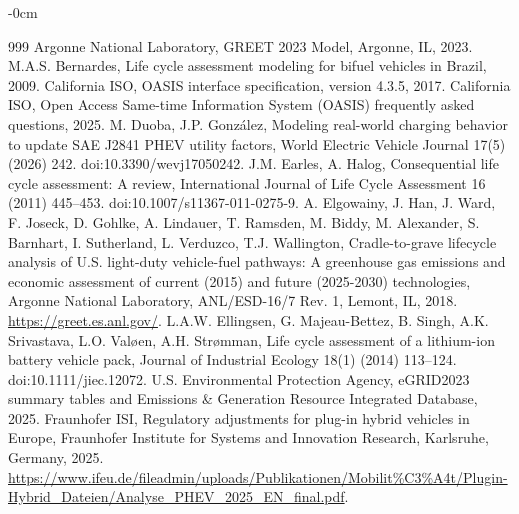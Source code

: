 \documentclass[cleantechnol,article,submit,pdftex,moreauthors]{Definitions/mdpi}
\begin{document}
%
\begin{adjustwidth}{-\extralength}{0cm}


\begin{thebibliography}{999}
Argonne National Laboratory, GREET 2023 Model, Argonne, IL, 2023.
M.A.S. Bernardes, Life cycle assessment modeling for bifuel vehicles in Brazil, 2009.
California ISO, OASIS interface specification, version 4.3.5, 2017.
California ISO, Open Access Same-time Information System (OASIS) frequently asked questions, 2025.
M. Duoba, J.P. González, Modeling real-world charging behavior to update SAE J2841 PHEV utility factors, World Electric Vehicle Journal 17(5) (2026) 242. doi:10.3390/wevj17050242.
J.M. Earles, A. Halog, Consequential life cycle assessment: A review, International Journal of Life Cycle Assessment 16 (2011) 445--453. doi:10.1007/s11367-011-0275-9.
A. Elgowainy, J. Han, J. Ward, F. Joseck, D. Gohlke, A. Lindauer, T. Ramsden, M. Biddy, M. Alexander, S. Barnhart, I. Sutherland, L. Verduzco, T.J. Wallington, Cradle-to-grave lifecycle analysis of U.S. light-duty vehicle-fuel pathways: A greenhouse gas emissions and economic assessment of current (2015) and future (2025-2030) technologies, Argonne National Laboratory, ANL/ESD-16/7 Rev. 1, Lemont, IL, 2018. \url{https://greet.es.anl.gov/}.
L.A.W. Ellingsen, G. Majeau-Bettez, B. Singh, A.K. Srivastava, L.O. Valøen, A.H. Strømman, Life cycle assessment of a lithium-ion battery vehicle pack, Journal of Industrial Ecology 18(1) (2014) 113--124. doi:10.1111/jiec.12072.
U.S. Environmental Protection Agency, eGRID2023 summary tables and Emissions \& Generation Resource Integrated Database, 2025.
Fraunhofer ISI, Regulatory adjustments for plug-in hybrid vehicles in Europe, Fraunhofer Institute for Systems and Innovation Research, Karlsruhe, Germany, 2025. \url{https://www.ifeu.de/fileadmin/uploads/Publikationen/Mobilit\%C3\%A4t/Plugin-Hybrid_Dateien/Analyse_PHEV_2025_EN_final.pdf}.

\end{thebibliography}
\end{adjustwidth}
\end{document}
